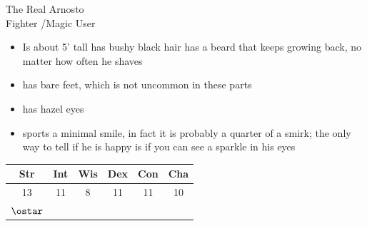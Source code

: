 \documentclass[11pt]{article}
\begin{document}
\hspace{0.4cm}
\begin{minipage}{0.55\textwidth}%
    \Huge{\Fontauri The Real Arnosto} \\
    \Large{Fighter \FighterLevel/Magic User \MagicUserLevel} \\
    \begin{normalsize}
        \begin{itemize}[topsep=0pt, itemsep=0pt, partopsep=0pt, parsep=0pt, leftmargin=*]
            \item Is about 5’ tall has bushy black hair has a beard that keeps growing back, no matter how often he shaves
            \item has bare feet, which is not uncommon in these parts
            \item has hazel eyes
            \item sports a minimal smile, in fact it is probably a quarter of a smirk; the only way to tell if he is happy is if you can see a sparkle in his eyes
        \end{itemize}
    \end{normalsize}
    \begin{large}
        \vspace{0.4cm}
        \begin{tabular}{cccccc}
            Str & Int & Wis & Dex & Con & Cha \\ \hline
            13 & 11 & 8 & 11 & 11 & 10\\ 
            $\ostar$ & & & & & 
        \end{tabular}
    \end{large}
    \vspace{0.4cm}


\end{minipage}
\end{document}
